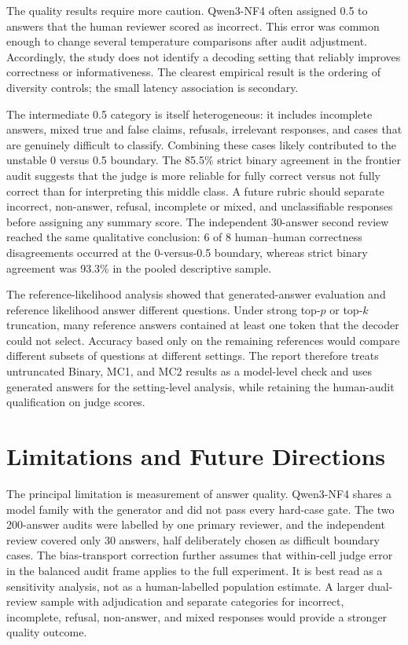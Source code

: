 \documentclass[11pt]{article}
\begin{document}
The quality results require more caution. Qwen3-NF4 often assigned 0.5 to
answers that the human reviewer scored as incorrect. This error was common
enough to change several temperature comparisons after audit adjustment.
Accordingly, the study does not identify a decoding setting that reliably
improves correctness or informativeness. The clearest empirical result is the
ordering of diversity controls; the small latency association is secondary.

The intermediate 0.5 category is itself heterogeneous: it includes incomplete
answers, mixed true and false claims, refusals, irrelevant responses, and cases
that are genuinely difficult to classify. Combining these cases likely
contributed to the unstable 0 versus 0.5 boundary. The 85.5\% strict binary
agreement in the frontier audit suggests that the judge is more reliable for
fully correct versus not fully correct than for interpreting this middle
class. A future rubric should separate incorrect, non-answer, refusal,
incomplete or mixed, and unclassifiable responses before assigning any summary
score. The independent 30-answer second review reached the same qualitative
conclusion: 6 of 8 human--human correctness disagreements occurred at the
0-versus-0.5 boundary, whereas strict binary agreement was 93.3\% in the pooled
descriptive sample.

The reference-likelihood analysis showed that generated-answer evaluation and
reference likelihood answer different questions. Under strong top-$p$ or
top-$k$ truncation, many reference answers
contained at least one token that the decoder could not select. Accuracy based
only on the remaining references would compare different subsets of questions
at different settings. The report therefore treats untruncated Binary, MC1,
and MC2 results as a model-level check and uses generated answers for the
setting-level analysis, while retaining the human-audit qualification on judge
scores.

\section{Limitations and Future Directions}

The principal limitation is measurement of answer quality. Qwen3-NF4 shares a
model family with the generator and did not pass every hard-case gate. The two
200-answer audits were labelled by one primary reviewer, and the independent
review covered only 30 answers, half deliberately chosen as difficult boundary
cases. The bias-transport correction further assumes that within-cell judge
error in the balanced audit frame applies to the full experiment. It is best
read as a sensitivity analysis, not as a human-labelled population estimate.
A larger dual-review sample with adjudication and separate categories for
incorrect, incomplete, refusal, non-answer, and mixed responses would provide a
stronger quality outcome.
\end{document}
